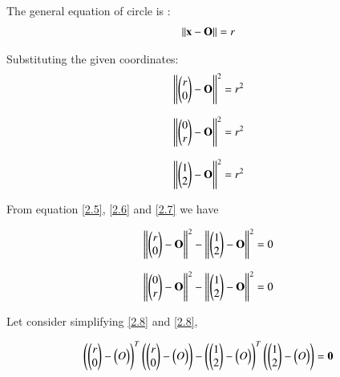 \documentclass[journal,12pt,twocolumn]{IEEEtran}
\begin{document}
The general equation of circle is :
\begin{align}
\norm{\vec{x} - \vec{O}} = r
\end{align}

Substituting the given coordinates:
\begin{align}
\norm{  \myvec{ r \\ 0 \\} - \vec{O}}^{2} = r^{2} \label{2.5}
\end{align}

\begin{align}
\norm{  \myvec{ 0 \\ r \\} - \vec{O}}^{2} = r^{2} \label{2.6}
\end{align}


\begin{align}
\norm{  \myvec{ 1 \\ 2 \\} - \vec{O}}^{2} = r^{2} \label{2.7}
\end{align}

From equation \ref{2.5}, \ref{2.6} and \ref{2.7} we have 

\begin{align}
\norm{  \myvec{ r \\ 0 \\} - \vec{O}}^{2}  - \norm{ \myvec{ 1 \\ 2 \\}  - \vec{O}}^{2}   = 0 \label{2.8}
\end{align}

\begin{align}
\norm{ \myvec{ 0 \\ r \\} - \vec{O}}^{2}   - \norm{\myvec{ 1 \\ 2 \\} - \vec{O}}^{2}  = 0 \label{2.9}
\end{align}

Let  consider
 simplifying   \ref{2.8} and \ref{2.8},

\begin{align}
\myvec{\myvec{r \\ 0 \\} - \myvec{O}}^T \myvec{\myvec{r \\ 0 \\} - \myvec{ O}} - \myvec{\myvec{1 \\ 2 \\} - \myvec{O}}^T\myvec{\myvec{1 \\ 2 \\} - \myvec{O}} = \vec{0} \label{2.10}
\end{align}
\end{document}
